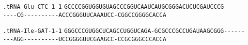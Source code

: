 \documentclass{article}
\newcommand{\rnabox}[1]{\colorbox{#1}{\texttt{#1}}}
\begin{document}
\vspace{-0.5mm}

\texttt{.tRNA-Glu-CTC-1-1}
\rnabox{G}\rnabox{C}\rnabox{C}\rnabox{C}\rnabox{C}\rnabox{G}\rnabox{G}\rnabox{U}\rnabox{G}\rnabox{G}\rnabox{U}\rnabox{G}\rnabox{U}\rnabox{A}\rnabox{G}\rnabox{C}\rnabox{C}\rnabox{C}\rnabox{G}\rnabox{G}\rnabox{U}\rnabox{C}\rnabox{A}\rnabox{A}\rnabox{U}\rnabox{C}\rnabox{A}\rnabox{U}\rnabox{G}\rnabox{C}\rnabox{G}\rnabox{G}\rnabox{G}\rnabox{A}\rnabox{C}\rnabox{U}\rnabox{C}\rnabox{U}\rnabox{C}\rnabox{G}\rnabox{A}\rnabox{U}\rnabox{C}\rnabox{C}\rnabox{C}\rnabox{G}\rnabox{-}\rnabox{-}\rnabox{-}\rnabox{-}\rnabox{-}\rnabox{-}\rnabox{-}\rnabox{-}\rnabox{-}\rnabox{-}\rnabox{C}\rnabox{G}\rnabox{-}\rnabox{-}\rnabox{-}\rnabox{-}\rnabox{-}\rnabox{-}\rnabox{-}\rnabox{-}\rnabox{-}\rnabox{-}\rnabox{A}\rnabox{C}\rnabox{C}\rnabox{C}\rnabox{G}\rnabox{G}\rnabox{G}\rnabox{U}\rnabox{U}\rnabox{C}\rnabox{A}\rnabox{A}\rnabox{A}\rnabox{U}\rnabox{C}\rnabox{C}\rnabox{-}\rnabox{C}\rnabox{G}\rnabox{G}\rnabox{C}\rnabox{C}\rnabox{G}\rnabox{G}\rnabox{G}\rnabox{G}\rnabox{C}\rnabox{A}\rnabox{C}\rnabox{C}\rnabox{A}

\vspace{-0.5mm}

\texttt{.tRNA-Ile-GAT-1-1}
\rnabox{G}\rnabox{G}\rnabox{G}\rnabox{C}\rnabox{C}\rnabox{C}\rnabox{G}\rnabox{U}\rnabox{G}\rnabox{G}\rnabox{C}\rnabox{U}\rnabox{C}\rnabox{A}\rnabox{G}\rnabox{C}\rnabox{C}\rnabox{U}\rnabox{G}\rnabox{G}\rnabox{U}\rnabox{C}\rnabox{A}\rnabox{G}\rnabox{A}\rnabox{-}\rnabox{G}\rnabox{C}\rnabox{G}\rnabox{C}\rnabox{C}\rnabox{C}\rnabox{G}\rnabox{C}\rnabox{C}\rnabox{U}\rnabox{G}\rnabox{A}\rnabox{U}\rnabox{A}\rnabox{A}\rnabox{G}\rnabox{C}\rnabox{G}\rnabox{G}\rnabox{G}\rnabox{-}\rnabox{-}\rnabox{-}\rnabox{-}\rnabox{-}\rnabox{-}\rnabox{-}\rnabox{-}\rnabox{-}\rnabox{A}\rnabox{G}\rnabox{G}\rnabox{-}\rnabox{-}\rnabox{-}\rnabox{-}\rnabox{-}\rnabox{-}\rnabox{-}\rnabox{-}\rnabox{-}\rnabox{-}\rnabox{U}\rnabox{C}\rnabox{C}\rnabox{G}\rnabox{G}\rnabox{G}\rnabox{G}\rnabox{U}\rnabox{U}\rnabox{C}\rnabox{G}\rnabox{A}\rnabox{A}\rnabox{G}\rnabox{C}\rnabox{C}\rnabox{-}\rnabox{C}\rnabox{C}\rnabox{G}\rnabox{C}\rnabox{G}\rnabox{G}\rnabox{G}\rnabox{C}\rnabox{C}\rnabox{C}\rnabox{A}\rnabox{C}\rnabox{C}\rnabox{A}

\vspace{-0.5mm}
\end{document}
